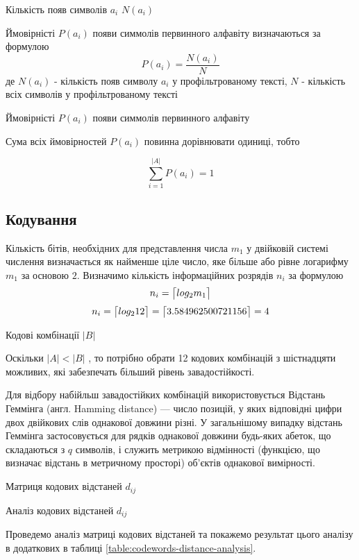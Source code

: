 \documentclass[a4paper,14pt]{extreport}
\DeclarePairedDelimiter{\ceil}{\lceil}{\rceil}
\begin{document}
 \begin{table}[H]
 	\caption{Кількість появ символів $a_i$ $N(a_i)$ }
 	\centering 	
 	 	
 \end{table}
  

Ймовірністі $P(a_i)$ появи симмолів первинного алфавіту визначаються за формулою
$$ P(a_i) = \frac{N(a_i)}{N}$$
де $N(a_i)$ - кількість появ символу $a_i$ у профільтрованому тексті, $N$ - кількість всіх символів у профільтрованому тексті

\begin{table}[H]
	\caption{Ймовірністі $P(a_i)$ появи симмолів первинного алфавіту}
	\centering
	\resizebox{\columnwidth}{!}{%
		
	}
\end{table}

Сума всіх ймовірностей $P(a_i)$ повинна дорівнювати одиниці, тобто
 
 $$ \sum_{i=1}^{|A|} P(a_i) = 1 $$

\subsection[Кодування]{Кодування}

Кількість бітів, необхідних для представлення числа $m_1$ у двійковій системі числення визначається як найменше ціле число, яке більше або рівне логарифму $m_1$ за основою $2$.
Визначимо кількість інформаційних розрядів $n_i $ за формулою 
$$n_i =\ceil[\big]{log_2 m_1} $$
$$n_i =\ceil[\big]{log_2 12}   =\ceil[\big]{3.584962500721156} = 4  $$
\begin{table}[H]
	\caption{Кодові комбінації $|B|$}
	\centering
	
\end{table}
Оскільки $|A| < |B|$ , то потрібно обрати 12 кодових комбінацій з шістнадцяти
можливих, які забезпечать більший рівень завадостійкості. \cite{hoek1992modified}

Для відбору набійльш завадостійких комбінацій використовується 
Відстань Геммінга (англ. Hamming distance)  — число позицій, у яких відповідні цифри двох двійкових слів однакової довжини різні. У загальнішому випадку відстань Геммінга застосовується для рядків однакової довжини будь-яких абеток, що складаються з $q$ символів, і служить метрикою відмінності (функцією, що визначає відстань в метричному просторі) об'єктів однакової вимірності. 

\begin{table}[H]
	\caption{Матриця кодових відстаней $d_{ij}$}
	\centering
		\resizebox{\columnwidth}{!}{%
		
	}
\end{table}
\begin{table}[H]
	\caption{Аналіз кодових відстаней $d_{ij}$}
	\centering
	
	\label{table:codewords-distance-analysis}
\end{table}
Проведемо аналіз матриці кодових відстаней та покажемо результат цього
аналізу в додаткових в таблиці \ref{table:codewords-distance-analysis}.
\end{document}
